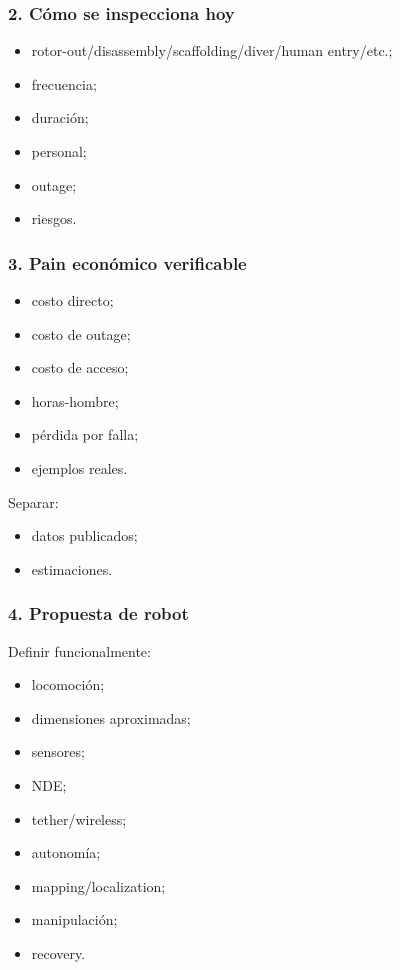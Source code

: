 \documentclass[11pt,a4paper]{article}
\begin{document}
\subsubsection*{2. Cómo se inspecciona hoy}
\begin{itemize}
\item rotor-out/disassembly/scaffolding/diver/human entry/etc.;
\item frecuencia;
\item duración;
\item personal;
\item outage;
\item riesgos.
\end{itemize}


\subsubsection*{3. Pain económico verificable}
\begin{itemize}
\item costo directo;
\item costo de outage;
\item costo de acceso;
\item horas-hombre;
\item pérdida por falla;
\item ejemplos reales.
\end{itemize}

Separar:

\begin{itemize}
\item datos publicados;
\item estimaciones.
\end{itemize}


\subsubsection*{4. Propuesta de robot}
Definir funcionalmente:

\begin{itemize}
\item locomoción;
\item dimensiones aproximadas;
\item sensores;
\item NDE;
\item tether/wireless;
\item autonomía;
\item mapping/localization;
\item manipulación;
\item recovery.
\end{itemize}
\end{document}
